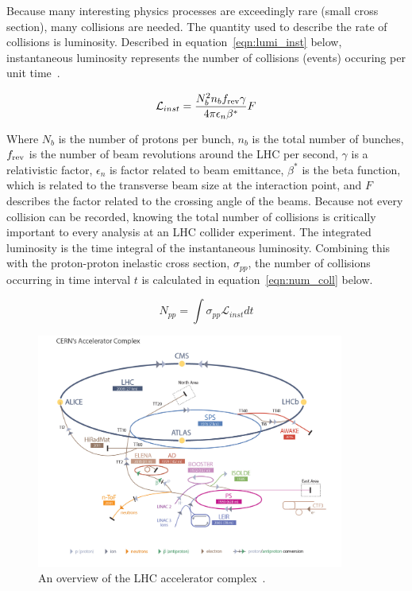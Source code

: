 \noindent Because many interesting physics processes are exceedingly rare (small cross section), many collisions
are needed. The quantity used to describe the rate of collisions is luminosity.
Described in equation~\ref{eqn:lumi_inst} below, instantaneous luminosity represents the number of collisions (events) occuring per unit time~\cite{lhc_bluebook}.

\begin{equation}
\label{eqn:lumi_inst}
\mathcal{L}_{inst} = \frac{N_{b}^{2}n_{b}f_{\textnormal{rev}}\gamma}{4\pi \epsilon_{n} \beta^{*}}F
\end{equation}

Where $N_{b}$ is the number of protons per bunch, $n_{b}$ is the total number of bunches, $f_{\textnormal{rev}}$ is the number of beam revolutions around the LHC per
second, $\gamma$ is a relativistic factor, $\epsilon_{n}$ is factor related to beam emittance, $\beta^{*}$ is the beta function, which is related to the transverse beam size
at the interaction point, and
$F$ describes the factor related to the crossing angle of the beams. Because not every collision can be recorded, knowing the total number of collisions is critically important
to every analysis at an LHC collider experiment. The integrated luminosity is the time integral of the instantaneous luminosity. Combining this with the proton-proton inelastic
cross section, $\sigma_{pp}$, the number of collisions occurring in time interval $t$ is calculated in equation~\ref{eqn:num_coll} below. 

\begin{equation}
\label{eqn:num_coll}
N_{pp} = \int \sigma_{pp}\mathcal{L}_{inst}dt 
\end{equation}


\begin{figure}[hbtp]
 \begin{center}
   \includegraphics[width=0.9\textwidth]{ch3_figs/lhc_complex.pdf}
   \caption[Overview of the LHC accelerator complex]{An overview of the LHC accelerator complex~\cite{lhcfig}.}
   \label{fig:lhc_complex}
 \end{center}
\end{figure}


